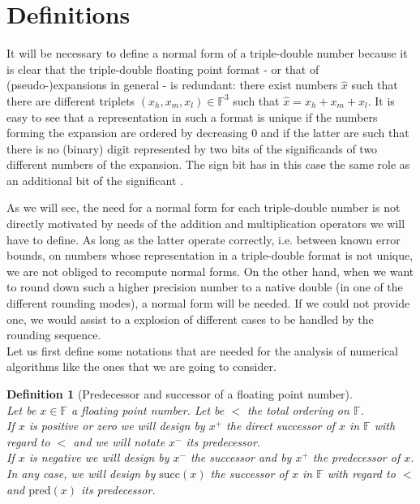 \documentclass[a4paper,10pt,twoside]{article}
\newtheorem{definition}[theorem]{Definition}
\newcommand{\F}{\ensuremath{\mathbb {F}}}
\newcommand{\hi}{\ensuremath{\mathit{h}}}
\newcommand{\mi}{\ensuremath{\mathit{m}}}
\newcommand{\lo}{\ensuremath{\mathit{l}}}
\renewcommand{\succ}{\ensuremath{\mathrm{succ}}}
\newcommand{\pred}{\ensuremath{\mathrm{pred}}}
\begin{document}
\section{Definitions}
It will be necessary to define a normal form of a triple-double number
because it is clear that the triple-double floating point format - or that of
(pseudo-)expansions in general - is redundant: there exist numbers 
$\hat{x}$ such that there are different triplets $(x_\hi ,x_\mi ,x_\lo ) \in \F^3$ 
such that $\hat{x} = x_\hi + x_\mi + x_\lo$. It is easy to see that a
representation in such a format is unique if the numbers forming the expansion
are ordered by decreasing 0 and if the latter are such that there is
no (binary) digit represented by two bits of the significands of two different
numbers of the expansion. The sign bit has in this case the same role as an
additional bit of the significant \cite{Finot-thesis}.\par
As we will see, the need for a normal form for each triple-double number is
not directly motivated by needs of the addition and multiplication operators
we will have to define. As long as the latter operate correctly, i.e. between
known error bounds, on numbers whose representation in a triple-double format is not unique, we are not
obliged to recompute normal forms. On the other hand, when we want to round
down such a higher precision number to a native double (in one of the
different rounding modes), a normal form will be needed. If we could not
provide one, we would assist to a explosion of different cases to be handled
by the rounding sequence.\\
Let us first define some notations that are needed for the analysis of numerical algorithms like 
the ones that we are going to consider. 
\begin{definition}[Predecessor and successor of a floating point number] \label{predsuccdef} ~\\
Let be $x \in \F$ a floating point number. Let be $<$ the total ordering on $\F$. \\
If $x$ is positive or zero we will design by $x^+$ the direct successor of $x$ in $\F$ with regard to $<$ 
and we will notate $x^-$ its predecessor.\\
If $x$ is negative we will design by $x^-$ the successor and by $x^+$ the predecessor of $x$.\\
In any case, we will design by $\succ\left( x \right)$ the successor of $x$ in $\F$ with regard to $<$ and 
$\pred\left(x\right)$ its predecessor.
\end{definition}
\end{document}
